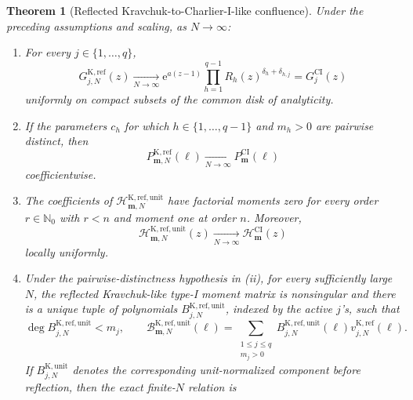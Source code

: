 \documentclass[10pt]{amsart}
\newcommand{\Nzero}{\mathbb N_0}
\newcommand{\e}{\mathrm e}
\newcommand{\mm}{\boldsymbol m}
\theoremstyle{plain}
\newtheorem{theorem}{Theorem}[section]
\theoremstyle{definition}
\theoremstyle{remark}
\begin{document}
\begin{theorem}[Reflected Kravchuk-to-Charlier-I-like confluence]
\label{thm:K-to-CI}
Under the preceding assumptions and scaling, as \(N\to\infty\):
\begin{enumerate}[label=\textup{(\roman*)}]
\item For every \(j\in\{1,\ldots,q\}\),
\begin{equation}
 G_{j,N}^{\mathrm K,\mathrm{ref}}(z)
 \xrightarrow[N\to\infty]{}
 \e^{a(z-1)}
 \prod_{h=1}^{q-1}R_h(z)^{\delta_h+\delta_{h,j}}
 =G_j^{\mathrm{CI}}(z)
 \label{eq:K-CI-row-limit}
\end{equation}
uniformly on compact subsets of the common disk of analyticity.
\item If the parameters \(c_h\) for which
\(h\in\{1,\ldots,q-1\}\) and \(m_h>0\) are pairwise distinct, then
\begin{equation}
 P_{\mm,N}^{\mathrm K,\mathrm{ref}}(\ell)
 \xrightarrow[N\to\infty]{} P_{\mm}^{\mathrm{CI}}(\ell)
 \label{eq:K-CI-A-limit}
\end{equation}
coefficientwise.
\item The coefficients of
\(\mathcal H_{\mm,N}^{\mathrm K,\mathrm{ref},\mathrm{unit}}\) have factorial
moments zero for every order \(r\in\Nzero\) with \(r<n\) and moment one at order \(n\). Moreover,
\begin{equation}
 \mathcal H_{\mm,N}^{\mathrm K,\mathrm{ref},\mathrm{unit}}(z)
 \xrightarrow[N\to\infty]{} \mathcal H_{\mm}^{\mathrm{CI}}(z)
 \label{eq:K-CI-B-limit}
\end{equation}
locally uniformly.
\item Under the pairwise-distinctness hypothesis in \textup{(ii)}, for every
sufficiently large \(N\), the reflected Kravchuk-like
type-I moment matrix is nonsingular and there is a unique tuple of
polynomials \(B_{j,N}^{\mathrm K,\mathrm{ref},\mathrm{unit}}\), indexed
by the active \(j\)'s, such that
\begin{equation}
 \deg B_{j,N}^{\mathrm K,\mathrm{ref},\mathrm{unit}}<m_j,
 \qquad
 \mathcal B_{\mm,N}^{\mathrm K,\mathrm{ref},\mathrm{unit}}(\ell)
 =\sum_{\substack{1\le j\le q\\m_j>0}}
 B_{j,N}^{\mathrm K,\mathrm{ref},\mathrm{unit}}(\ell)
 v_{j,N}^{\mathrm K,\mathrm{ref}}(\ell).
 \label{eq:K-CI-component-decomposition}
\end{equation}
If \(B_{j,N}^{\mathrm K,\mathrm{unit}}\) denotes the corresponding
unit-normalized component before reflection, then the exact finite-\(N\)
relation is
\begin{equation}

\end{equation}
\end{enumerate}
\end{theorem}
\end{document}
